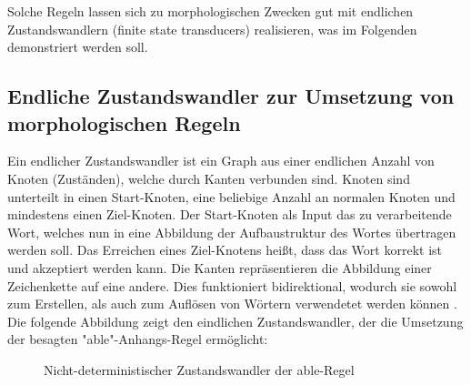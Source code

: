 \documentclass[12pt]{report}
\begin{document}
Solche Regeln lassen sich zu morphologischen Zwecken gut mit endlichen Zustandswandlern (finite state transducers) realisieren, was im Folgenden demonstriert werden soll.

\subsection{Endliche Zustandswandler zur Umsetzung von morphologischen Regeln}
Ein endlicher Zustandswandler ist ein Graph aus einer endlichen Anzahl von Knoten (Zuständen), welche durch Kanten verbunden sind. Knoten sind unterteilt in einen Start-Knoten, eine beliebige Anzahl an normalen Knoten und mindestens einen Ziel-Knoten. Der Start-Knoten als Input das zu verarbeitende Wort, welches nun in eine Abbildung der Aufbaustruktur des Wortes übertragen werden soll. Das Erreichen eines Ziel-Knotens heißt, dass das Wort korrekt ist und akzeptiert werden kann. Die Kanten repräsentieren die Abbildung einer Zeichenkette auf eine andere. Dies funktioniert bidirektional, wodurch sie sowohl zum Erstellen, als auch zum Auflösen von Wörtern verwendetet werden können \cite{cop04}. Die folgende Abbildung zeigt den eindlichen Zustandswandler, der die Umsetzung der besagten "able"-Anhangs-Regel ermöglicht:
\\

\begin{figure}
\begin{center}
\caption{Nicht-deterministischer Zustandswandler der able-Regel}
\end{center}
\end{figure}
\end{document}
